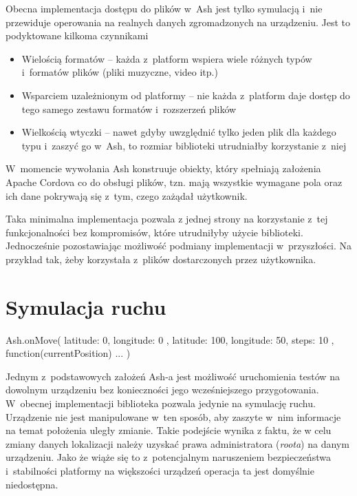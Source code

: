 \documentclass{xmgr}
\begin{document}
Obecna implementacja dostępu do plików w~Ash jest tylko symulacją i~nie przewiduje operowania na realnych danych zgromadzonych na urządzeniu. Jest to podyktowane kilkoma czynnikami

\begin{itemize}
  \item Wielością formatów -- każda z~platform wspiera wiele różnych typów i~formatów plików (pliki muzyczne, video itp.) 
  \item Wsparciem uzależnionym od platformy -- nie każda z~platform daje dostęp do tego samego zestawu formatów i~rozszerzeń plików
  \item Wielkością wtyczki -- nawet gdyby uwzględnić tylko jeden plik dla każdego typu i~zaszyć go w~Ash, to rozmiar biblioteki utrudniałby korzystanie z~niej
\end{itemize}

W~momencie wywołania Ash konstruuje obiekty, który spełniają założenia Apache Cordova co do obsługi plików, tzn. mają wszystkie wymagane pola oraz ich dane pokrywają się z~tym, czego zażądał użytkownik. 

Taka minimalna implementacja pozwala z jednej strony  na korzystanie z~tej funkcjonalności bez kompromisów, które utrudniłyby użycie biblioteki. Jednocześnie pozostawiając możliwość podmiany implementacji w~przyszłości. Na przykład tak, żeby korzystała z~plików dostarczonych przez użytkownika.

\section{Symulacja ruchu}

\begin{javascriptcode}
Ash.onMove({
    latitude: 0, 
    longitude: 0
}, {
    latitude: 100, 
    longitude: 50, 
    steps: 10
}, function(currentPosition){ ... })
\end{javascriptcode}

Jednym z~podstawowych założeń Ash-a jest możliwość uruchomienia testów na dowolnym urządzeniu bez konieczności jego wcześniejszego przygotowania. W~obecnej implementacji biblioteka pozwala jedynie na symulację ruchu. Urządzenie nie jest manipulowane w~ten sposób, aby zaszyte w~nim informacje na temat położenia uległy zmianie. Takie podejście wynika z faktu, że w celu zmiany danych lokalizacji należy uzyskać prawa administratora (\textit{roota}) na danym urządzeniu. Jako że wiąże się to z~potencjalnym naruszeniem bezpieczeństwa i~stabilności platformy na większości urządzeń operacja ta jest domyślnie niedostępna. 
\end{document}
